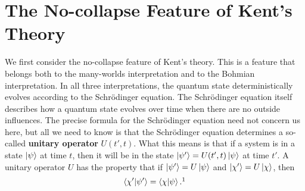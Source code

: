 
\section{The No-collapse Feature of Kent's Theory}
We first consider the no-collapse feature of Kent's theory. This is a feature that belongs both to the many-worlds interpretation and to the Bohmian interpretation. In all three interpretations, the quantum state deterministically evolves according to the Schr\"{o}dinger equation. The Schr\"{o}dinger equation itself describes how a quantum state evolves over time when there are no outside influences. The precise formula for the Schr\"{o}dinger equation need not concern us here, but all we need to know is that the Schr\"{o}dinger equation determines a so-called \textbf{unitary operator} $U(t',t)$. %
%
What this means is that if a system is in a state $\ket{\psi}$ at time $t$, then it will be in the state $\ket{\psi'}=U(t',t)\ket{\psi}$
at time $t'$. A unitary operator $U$ has the property that if $\ket{\psi'}=U\ket{\psi}$ and $\ket{\chi'}=U\ket{\chi}$, then 
\begin{equation}\label{unitarycond}
\ip{\chi'}{\psi'}=\ip{\chi}{\psi}.\protect\footnotemark
\end{equation}
